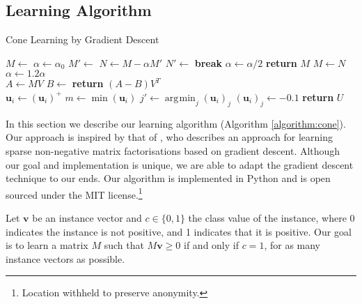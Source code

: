 \documentclass{article}
\DeclareMathOperator*{\argmin}{\arg\!\min}
\begin{document}
\subsection{Learning Algorithm}

\begin{algorithm}
\caption{Cone Learning by Gradient Descent}\label{algorithm:cone}
\begin{algorithmic}
  \State $M \gets$ 
  \State $\alpha \gets \alpha_0$
  \Loop
    \State $M' \gets$ 
    \Loop
      \State $N \gets M - \alpha M'$
      \State $N' \gets$ 
        \State \textbf{break}
      \EndIf
      \State $\alpha \gets \alpha/2$
        \State \textbf{return} $M$
      \EndIf
    \EndLoop
    \State $M \gets N$
    \State $\alpha \gets 1.2\alpha$
  \EndLoop
  \EndProcedure
  \\
  \State $A \gets MV$
  \State $B \gets$ 
  \State \textbf{return} $(A - B)V^T$
  \EndProcedure
  \\
      \State $\mathbf{u}_i \gets (\mathbf{u}_i)^+$
    \Else
      \State $m \gets \min(\mathbf{u}_i)$
        \State $j' \gets \argmin_j{(\mathbf{u}_i)_j}$
        \State $(\mathbf{u}_i)_j \gets -0.1$
      \EndIf
    \EndIf
  \EndFor
  \State \textbf{return} $U$
  \EndProcedure
\end{algorithmic}
\end{algorithm}

In this section we describe our learning algorithm (Algorithm
\ref{algorithm:cone}). Our approach is inspired by that of
, who describes an approach for learning sparse
non-negative matrix factorisations based on gradient descent. Although
our goal and implementation is unique, we are able to adapt the
gradient descent technique to our ends. Our algorithm is implemented
in Python and is open sourced under the MIT license.\footnote{Location
  withheld to preserve anonymity.}

Let $\mathbf{v}$ be an instance vector and $c \in \{0,1\}$ the class value of
the instance, where 0 indicates the instance is not positive, and 1
indicates that it is positive. Our goal is to learn a matrix $M$ such
that $M\mathbf{v} \ge 0$ if and only if $c = 1$, for as many instance vectors
as possible.
\end{document}
